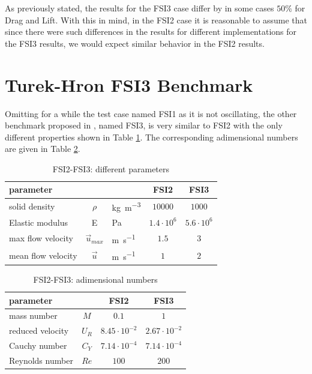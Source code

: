 As previously stated, the results for the FSI3 case differ by in some cases $50\%$ for Drag and Lift. With this in mind, in the FSI2 case it is reasonable to assume that since there were such differences in the results for different implementations for the FSI3 results, we would expect similar behavior in the FSI2 results.


\newpage


\section{Turek-Hron FSI3 Benchmark}
\label{sec:FSI1-FSI3}

Omitting for a while the test case named FSI1 as it is not oscillating, the other benchmark proposed in \cite{turek2006proposal}, named FSI3, is very similar to FSI2 with the only different properties shown in Table \ref{table:FSI3-diff}. The corresponding adimensional numbers are given in Table \ref{table:FSI3-adim}. 



\begin{table}[!htb]
	\begin{center}
		\begin{tabular}{ l c l | c | c } 
			parameter & & & FSI2 & FSI3   \\ 
			\hline
			solid density  &  $\rho$ & \si{kg.m^{-3}} & $10000$ & $1000$     \\
			Elastic modulus  & E & \si{Pa} & $1.4\cdot 10^6$ & $5.6\cdot 10^6$   \\
			max flow velocity & $\vec{u}_{max}$ & \si{m.s^{-1}} & $1.5$ & $3$ \\
			mean flow velocity & $\vec{u}$ & \si{m.s^{-1}} & $1$ & $2$  \\
		\end{tabular}
	\end{center}
	\caption{FSI2-FSI3: different parameters}
	\label{table:FSI3-diff}
\end{table}


\begin{table}[!htb]
	\begin{center}
		\begin{tabular}{ l c | c | c} 
			parameter & & FSI2 & FSI3   \\ 
			\hline
			mass number  & $M$ & $0.1$ & $1$     \\
			reduced velocity & $U_R$ &  $8.45 \cdot 10^{-2}$  & $2.67\cdot 10^{-2}$  \\
			Cauchy number  & $C_Y$ & \cellcolor{yellow!25}  $7.14\cdot 10^{-4}$  & \cellcolor{yellow!25} $7.14\cdot 10^{-4}$  \\
			Reynolds number & $Re$ & $100$ & $200$ \\	
		\end{tabular}
	\end{center}
	\caption{FSI2-FSI3: adimensional numbers}
	\label{table:FSI3-adim}
\end{table}


